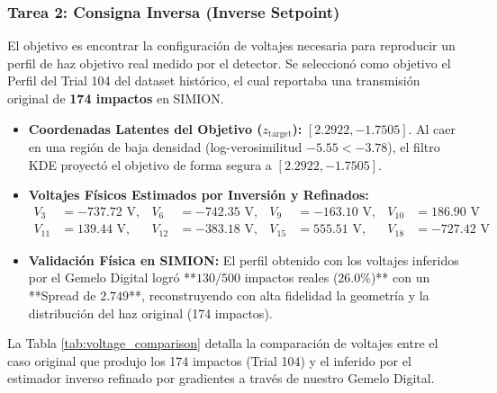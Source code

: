 \documentclass[12pt,letterpaper]{article}
\begin{document}
\subsubsection{Tarea 2: Consigna Inversa (Inverse Setpoint)}
El objetivo es encontrar la configuración de voltajes necesaria para reproducir un perfil de haz objetivo real medido por el detector. Se seleccionó como objetivo el Perfil del Trial 104 del dataset histórico, el cual reportaba una transmisión original de \textbf{174 impactos} en SIMION.
\begin{itemize}
    \item \textbf{Coordenadas Latentes del Objetivo ($z_{\text{target}}$):} $[2.2922, -1.7505]$. Al caer en una región de baja densidad (log-verosimilitud $-5.55 < -3.78$), el filtro KDE proyectó el objetivo de forma segura a $[2.2922, -1.7505]$.
    \item \textbf{Voltajes Físicos Estimados por Inversión y Refinados:} 
    \begin{align*}
        V_3 &= -737.72\text{ V}, & V_6 &= -742.35\text{ V}, & V_9 &= -163.10\text{ V}, & V_{10} &= 186.90\text{ V} \\
        V_{11} &= 139.44\text{ V}, & V_{12} &= -383.18\text{ V}, & V_{15} &= 555.51\text{ V}, & V_{18} &= -727.42\text{ V}
    \end{align*}
    \item \textbf{Validación Física en SIMION:} El perfil obtenido con los voltajes inferidos por el Gemelo Digital logró **$130/500$ impactos reales (26.0\%)** con un **Spread de $2.749$**, reconstruyendo con alta fidelidad la geometría y la distribución del haz original (174 impactos).
\end{itemize}

La Tabla \ref{tab:voltage_comparison} detalla la comparación de voltajes entre el caso original que produjo los 174 impactos (Trial 104) y el inferido por el estimador inverso refinado por gradientes a través de nuestro Gemelo Digital.
\end{document}
